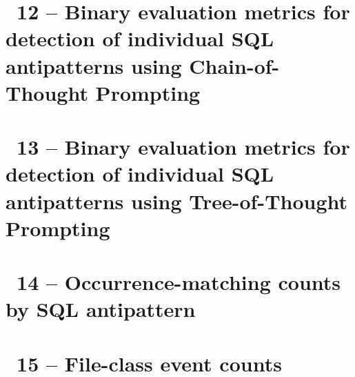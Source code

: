 \clearpage
{}
\makeatletter
\def\@currentlabel{12}
\makeatother
{}\label{chapter:appendix-chain-of-thought-accuracy}
\chapter*{\appendixTitle~12 -- Binary evaluation metrics for detection of individual SQL antipatterns using Chain-of-Thought Prompting}


\clearpage
{}
\makeatletter
\def\@currentlabel{13}
\makeatother
{}\label{chapter:appendix-tree-of-thought-accuracy}
\chapter*{\appendixTitle~13 -- Binary evaluation metrics for detection of individual SQL antipatterns using Tree-of-Thought Prompting}


\clearpage
{}
\makeatletter
\def\@currentlabel{14}
\makeatother
{}\label{chapter:appendix-localisation-confusion-matrices}
\chapter*{\appendixTitle~14 -- Occurrence-matching counts by SQL antipattern}


\clearpage
{}
\makeatletter
\def\@currentlabel{15}
\makeatother
{}\label{chapter:appendix-classification-confusion-matrices}
\chapter*{\appendixTitle~15 -- File-class event counts}

